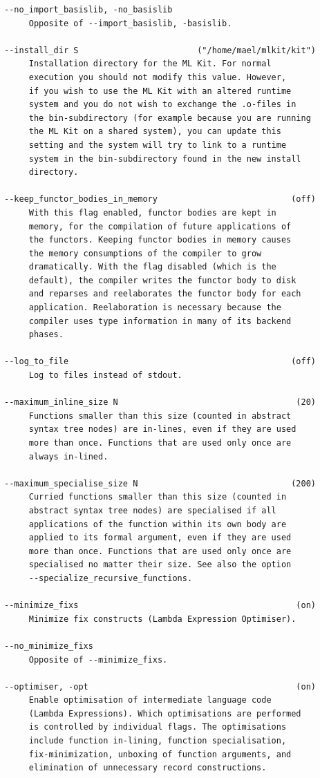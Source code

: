 \documentclass[12pt]{book}
\begin{document}
\begin{verbatim}
--no_import_basislib, -no_basislib
     Opposite of --import_basislib, -basislib.

--install_dir S                        ("/home/mael/mlkit/kit")
     Installation directory for the ML Kit. For normal
     execution you should not modify this value. However,
     if you wish to use the ML Kit with an altered runtime
     system and you do not wish to exchange the .o-files in
     the bin-subdirectory (for example because you are running
     the ML Kit on a shared system), you can update this
     setting and the system will try to link to a runtime
     system in the bin-subdirectory found in the new install
     directory.

--keep_functor_bodies_in_memory                           (off)
     With this flag enabled, functor bodies are kept in
     memory, for the compilation of future applications of
     the functors. Keeping functor bodies in memory causes
     the memory consumptions of the compiler to grow
     dramatically. With the flag disabled (which is the
     default), the compiler writes the functor body to disk
     and reparses and reelaborates the functor body for each
     application. Reelaboration is necessary because the
     compiler uses type information in many of its backend
     phases.

--log_to_file                                             (off)
     Log to files instead of stdout.

--maximum_inline_size N                                    (20)
     Functions smaller than this size (counted in abstract
     syntax tree nodes) are in-lines, even if they are used
     more than once. Functions that are used only once are
     always in-lined.

--maximum_specialise_size N                               (200)
     Curried functions smaller than this size (counted in
     abstract syntax tree nodes) are specialised if all
     applications of the function within its own body are
     applied to its formal argument, even if they are used
     more than once. Functions that are used only once are
     specialised no matter their size. See also the option
     --specialize_recursive_functions.

--minimize_fixs                                            (on)
     Minimize fix constructs (Lambda Expression Optimiser).

--no_minimize_fixs
     Opposite of --minimize_fixs.

--optimiser, -opt                                          (on)
     Enable optimisation of intermediate language code
     (Lambda Expressions). Which optimisations are performed
     is controlled by individual flags. The optimisations
     include function in-lining, function specialisation,
     fix-minimization, unboxing of function arguments, and
     elimination of unnecessary record constructions.


\end{verbatim}
\end{document}
